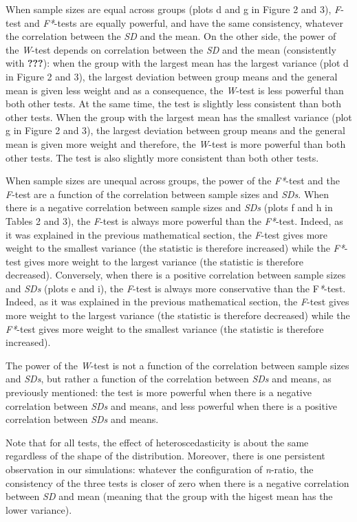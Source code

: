 \documentclass[man,floatsintext]{apa6}
\begin{document}
When sample sizes are equal across groups (plots d and g in Figure 2 and
3), \emph{F}-test and \emph{F*}-tests are equally powerful, and have the
same consistency, whatever the correlation between the \emph{SD} and the
mean. On the other side, the power of the \emph{W}-test depends on
correlation between the \emph{SD} and the mean (consistently with
{\textbf{???}}): when the group with the largest mean has the largest
variance (plot d in Figure 2 and 3), the largest deviation between group
means and the general mean is given less weight and as a consequence,
the \emph{W}-test is less powerful than both other tests. At the same
time, the test is slightly less consistent than both other tests. When
the group with the largest mean has the smallest variance (plot g in
Figure 2 and 3), the largest deviation between group means and the
general mean is given more weight and therefore, the \emph{W}-test is
more powerful than both other tests. The test is also slightly more
consistent than both other tests.

When sample sizes are unequal across groups, the power of the
\emph{F*}-test and the \emph{F}-test are a function of the correlation
between sample sizes and \emph{SDs}. When there is a negative
correlation between sample sizes and \emph{SDs} (plots f and h in Tables
2 and 3), the \emph{F}-test is always more powerful than the
\emph{F*}-test. Indeed, as it was explained in the previous mathematical
section, the \emph{F}-test gives more weight to the smallest variance
(the statistic is therefore increased) while the \emph{F*}-test gives
more weight to the largest variance (the statistic is therefore
decreased). Conversely, when there is a positive correlation between
sample sizes and \emph{SDs} (plots e and i), the \emph{F}-test is always
more conservative than the F\emph{*}-test. Indeed, as it was explained
in the previous mathematical section, the \emph{F}-test gives more
weight to the largest variance (the statistic is therefore decreased)
while the \emph{F*}-test gives more weight to the smallest variance (the
statistic is therefore increased).

The power of the \emph{W}-test is not a function of the correlation
between sample sizes and \emph{SDs}, but rather a function of the
correlation between \emph{SDs} and means, as previously mentioned: the
test is more powerful when there is a negative correlation between
\emph{SDs} and means, and less powerful when there is a positive
correlation between \emph{SDs} and means.

Note that for all tests, the effect of heteroscedasticity is about the
same regardless of the shape of the distribution. Moreover, there is one
persistent observation in our simulations: whatever the configuration of
\emph{n}-ratio, the consistency of the three tests is closer of zero
when there is a negative correlation between \emph{SD} and mean (meaning
that the group with the higest mean has the lower variance).
\end{document}
